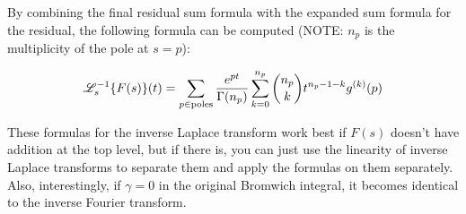 \documentclass[12pt]{article}
\newcommand \ILaplace [3] {\ensuremath{\mathscr{L}_{#1}^{-1}\!\left\{#2\right\}\!\left(#3\right)}}
\begin{document}
By combining the final residual sum formula with the expanded sum formula for the residual, the following formula can be computed (NOTE: $n_p$ is the multiplicity of the pole at $s=p$):

 {}
\begin{equation}\label{eqn:ilaplace-final-eqn}
	\ILaplace{s}{F(s)}{t} = \sum_{p \in {\rm poles}} \dfrac {e^{p t}} {\Gamma(n_p)} \sum_{k = 0}^{n_p} \binom{n_p}{k} t^{n_p - 1 - k} g^{(k)}(p)
\end{equation}

These formulas for the inverse Laplace transform work best if $F(s)$ doesn't have addition at the top level, but if there is, you can just use the linearity of inverse Laplace transforms to separate them and apply the formulas on them separately. Also, interestingly, if $\gamma = 0$ in the original Bromwich integral, it becomes identical to the inverse Fourier transform.

\end{document}
